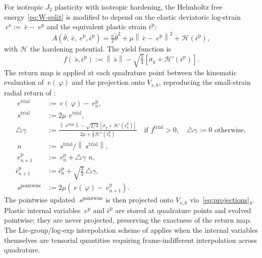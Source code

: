 \documentclass[12pt]{article}
\newcommand{\edev}{~e}
\newcommand{\ebar}{\bar{~e}}
\newcommand{\sdev}{~s}
\newcommand{\sbar}{\bar{~s}}
\newcommand{\thbar}{\bar{\theta}}
\newcommand{\norm}[1]{\left\lVert {#1} \right\rVert}
\begin{document}
For isotropic $J_2$ plasticity with isotropic hardening, the
Helmholtz free energy~\eqref{eq:W-split} is modified to depend on
the elastic deviatoric log-strain
$\edev^{\mathrm{e}} := \ebar - \edev^{\mathrm{p}}$
and the equivalent plastic strain $\bar\epsilon^{\mathrm{p}}$:
\begin{equation}
  \label{eq:W-plastic}
  A(\thbar, \ebar, \edev^{\mathrm{p}}, \bar\epsilon^{\mathrm{p}})
  =
  \tfrac{\kappa}{2} \thbar^2
  +
  \mu \norm{\ebar - \edev^{\mathrm{p}}}^2
  +
  \mathcal{H}(\bar\epsilon^{\mathrm{p}}),
\end{equation}
with $\mathcal{H}$ the hardening potential. The yield function is
\begin{equation}
  \label{eq:yield}
  f(\sbar, \bar\epsilon^{\mathrm{p}})
  :=
  \norm{\sbar}
  -
  \sqrt{\tfrac{2}{3}} \left[\sigma_y + \mathcal{H}'(\bar\epsilon^{\mathrm{p}})\right].
\end{equation}
The return map is applied at each quadrature point between the
kinematic evaluation of $\edev(~\varphi)$ and the projection onto
$V_{s,h}$, reproducing the small-strain radial return of
\citet{Simo:1992}:
\begin{equation}
  \label{eq:return-map}
  \begin{split}
    \edev^{\mathrm{trial}}
    & := \edev(~\varphi)
        - \edev^{\mathrm{p}}_{n},
    \\
    \sdev^{\mathrm{trial}}
    & := 2\mu \, \edev^{\mathrm{trial}},
    \\
    \triangle \gamma
    & :=
    \frac{\norm{\sdev^{\mathrm{trial}}} - \sqrt{2/3}\,[\sigma_y + \mathcal{H}'(\bar\epsilon^{\mathrm{p}}_{n})]}
         {2\mu + \tfrac{2}{3} \mathcal{H}''(\bar\epsilon^{\mathrm{p}}_{n})}
    \quad\text{if } f^{\mathrm{trial}} > 0,
    \quad \triangle\gamma := 0 \text{ otherwise},
    \\
    ~n & := \sdev^{\mathrm{trial}} / \norm{\sdev^{\mathrm{trial}}},
    \\
    \edev^{\mathrm{p}}_{n+1}
    & := \edev^{\mathrm{p}}_{n} + \triangle \gamma \, ~n,
    \\
    \bar\epsilon^{\mathrm{p}}_{n+1}
    & := \bar\epsilon^{\mathrm{p}}_{n} + \sqrt{\tfrac{2}{3}}\,\triangle \gamma,
    \\
    \sdev^{\mathrm{pointwise}}
    & := 2\mu \left( \edev(~\varphi) - \edev^{\mathrm{p}}_{n+1} \right).
  \end{split}
\end{equation}
The pointwise updated $\sdev^{\mathrm{pointwise}}$ is then
projected onto $V_{s,h}$ via~\eqref{eq:projections}$_4$. Plastic
internal variables $\edev^{\mathrm{p}}$ and
$\bar\epsilon^{\mathrm{p}}$ are stored at quadrature points and
evolved pointwise; they are never projected, preserving the
exactness of the return map. The Lie-group/log-exp interpolation
scheme of \citet{Mota.etal:2013} applies when the internal variables
themselves are tensorial quantities requiring frame-indifferent
interpolation across quadrature.
\end{document}
